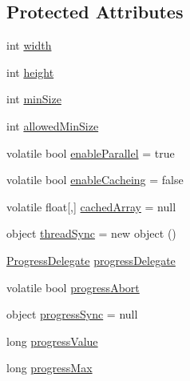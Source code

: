 \subsection*{Protected Attributes}
\begin{DoxyCompactItemize}
\item 
int \hyperlink{class_turbo_wavelets_1_1_wavelet2_d_aaa4b3711957fe1798980e6891331a08d}{width}
\item 
int \hyperlink{class_turbo_wavelets_1_1_wavelet2_d_afb2aa87b89b82f329357cbdc0cde18a8}{height}
\item 
int \hyperlink{class_turbo_wavelets_1_1_wavelet2_d_af5148ef1a46dd5694ccea13aa8f1b9e2}{min\+Size}
\item 
int \hyperlink{class_turbo_wavelets_1_1_wavelet2_d_a949bac2b4f540092cf7cc8916968cdc0}{allowed\+Min\+Size}
\item 
volatile bool \hyperlink{class_turbo_wavelets_1_1_wavelet2_d_a742fff705da3ff5a4b6d67e9a56637be}{enable\+Parallel} = true
\item 
volatile bool \hyperlink{class_turbo_wavelets_1_1_wavelet2_d_a2b5e1636f40bab5b6ee88f6e8bb1b653}{enable\+Cacheing} = false
\item 
volatile float\mbox{[},\mbox{]} \hyperlink{class_turbo_wavelets_1_1_wavelet2_d_a07949ac8b81d7afa1776e92f11b74834}{cached\+Array} = null
\item 
object \hyperlink{class_turbo_wavelets_1_1_wavelet2_d_ad69614eed43d939d02cf11076f95adee}{thread\+Sync} = new object ()
\item 
\hyperlink{class_turbo_wavelets_1_1_wavelet2_d_aec52fe74aa08e073119064ef4ac3fe93}{Progress\+Delegate} \hyperlink{class_turbo_wavelets_1_1_wavelet2_d_a41d9135f22a6b2cb661b2cc2ccb768ff}{progress\+Delegate}
\item 
volatile bool \hyperlink{class_turbo_wavelets_1_1_wavelet2_d_adb4984a01d9ab29c0056b18cbbcdef6f}{progress\+Abort}
\item 
object \hyperlink{class_turbo_wavelets_1_1_wavelet2_d_a08a8ff6259f0d66913715c00ed6e167b}{progress\+Sync} = null
\item 
long \hyperlink{class_turbo_wavelets_1_1_wavelet2_d_ad2fad1f07e9e5c4901c0cdc925991e49}{progress\+Value}
\item 
long \hyperlink{class_turbo_wavelets_1_1_wavelet2_d_a7cbf7ce44310a48178f36101a4c03add}{progress\+Max}
\end{DoxyCompactItemize}
